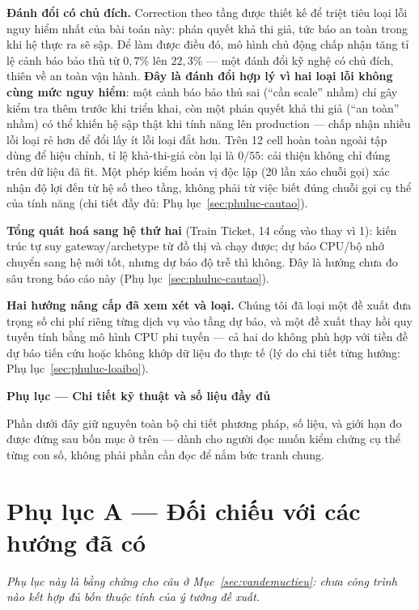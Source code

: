 \documentclass[11pt,a4paper]{article}
\begin{document}
\textbf{Đánh đổi có chủ đích.} Correction theo tầng được thiết kế để triệt tiêu
loại lỗi nguy hiểm nhất của bài toán này: phán quyết khả thi giả, tức báo an toàn
trong khi hệ thực ra sẽ sập. Để làm được điều đó, mô hình chủ động chấp nhận tăng
tỉ lệ cảnh báo bảo thủ từ $0,7\%$ lên $22,3\%$ --- một đánh đổi kỹ nghệ có chủ
đích, thiên về an toàn vận hành. \textbf{Đây là đánh đổi hợp lý vì hai loại lỗi
không cùng mức nguy hiểm}: một cảnh báo bảo thủ sai (``cần scale'' nhầm) chỉ gây
kiểm tra thêm trước khi triển khai, còn một phán quyết khả thi giả (``an toàn''
nhầm) có thể khiến hệ sập thật khi tính năng lên production --- chấp nhận nhiều
lỗi loại rẻ hơn để đổi lấy ít lỗi loại đắt hơn. Trên 12 cell hoàn toàn ngoài tập
dùng để hiệu chỉnh, tỉ lệ khả-thi-giả còn lại là $0/55$: cải thiện không chỉ
đúng trên dữ liệu đã fit. Một phép kiểm hoán vị độc lập (20 lần xáo chuỗi gọi)
xác nhận độ lợi đến từ hệ số theo tầng, không phải từ việc biết đúng chuỗi gọi
cụ thể của tính năng (chi tiết đầy đủ: Phụ lục~\ref{sec:phuluc-cautao}).

\textbf{Tổng quát hoá sang hệ thứ hai} (Train Ticket, 14 cổng vào thay vì 1):
kiến trúc tự suy gateway/archetype từ đồ thị và chạy được; dự báo CPU/bộ nhớ
chuyển sang hệ mới tốt, nhưng dự báo độ trễ thì không. Đây là hướng chưa đo sâu
trong báo cáo này (Phụ lục~\ref{sec:phuluc-cautao}).

\textbf{Hai hướng nâng cấp đã xem xét và loại.} Chúng tôi đã loại một đề xuất
đưa trọng số chi phí riêng từng dịch vụ vào tầng dự báo, và một đề xuất thay hồi
quy tuyến tính bằng mô hình CPU phi tuyến --- cả hai do không phù hợp với tiền
đề dự báo tiến cứu hoặc không khớp dữ liệu đo thực tế (lý do chi tiết từng hướng:
Phụ lục~\ref{sec:phuluc-loaibo}).

\clearpage
\begin{center}\LARGE\textbf{Phụ lục --- Chi tiết kỹ thuật và số liệu đầy đủ}\end{center}
\bigskip
\noindent Phần dưới đây giữ nguyên toàn bộ chi tiết phương pháp, số liệu, và giới
hạn đo được đứng sau bốn mục ở trên --- dành cho người đọc muốn kiểm chứng cụ thể
từng con số, không phải phần cần đọc để nắm bức tranh chung.

\section{Phụ lục A --- Đối chiếu với các hướng đã có}\label{sec:phuluc-doichieu}
\emph{Phụ lục này là bằng chứng cho câu ở Mục~\ref{sec:vandemuctieu}: chưa công
trình nào kết hợp đủ bốn thuộc tính của ý tưởng đề xuất.}
\end{document}
